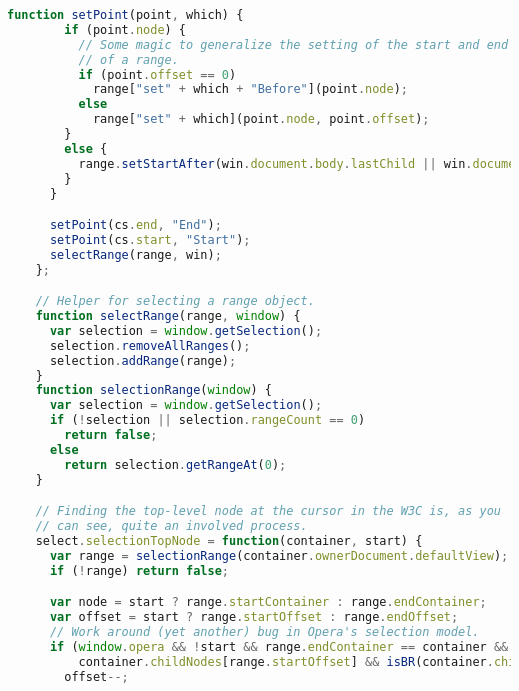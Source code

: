 \begin{lstlisting}[language=Javascript]
      function setPoint(point, which) {
        if (point.node) {
          // Some magic to generalize the setting of the start and end
          // of a range.
          if (point.offset == 0)
            range["set" + which + "Before"](point.node);
          else
            range["set" + which](point.node, point.offset);
        }
        else {
          range.setStartAfter(win.document.body.lastChild || win.document.body);
        }
      }

      setPoint(cs.end, "End");
      setPoint(cs.start, "Start");
      selectRange(range, win);
    };

    // Helper for selecting a range object.
    function selectRange(range, window) {
      var selection = window.getSelection();
      selection.removeAllRanges();
      selection.addRange(range);
    }
    function selectionRange(window) {
      var selection = window.getSelection();
      if (!selection || selection.rangeCount == 0)
        return false;
      else
        return selection.getRangeAt(0);
    }

    // Finding the top-level node at the cursor in the W3C is, as you
    // can see, quite an involved process.
    select.selectionTopNode = function(container, start) {
      var range = selectionRange(container.ownerDocument.defaultView);
      if (!range) return false;

      var node = start ? range.startContainer : range.endContainer;
      var offset = start ? range.startOffset : range.endOffset;
      // Work around (yet another) bug in Opera's selection model.
      if (window.opera && !start && range.endContainer == container && range.endOffset == range.startOffset + 1 &&
          container.childNodes[range.startOffset] && isBR(container.childNodes[range.startOffset]))
        offset--;


\end{lstlisting}
